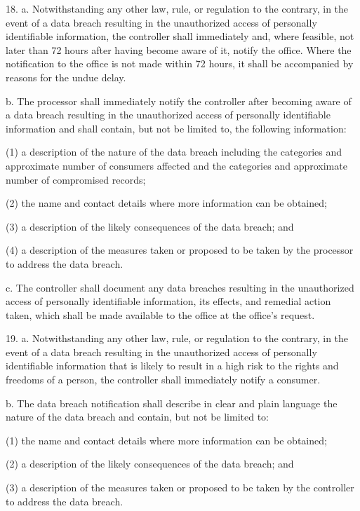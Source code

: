  

     18.  a.  Notwithstanding any other law, rule, or regulation to the contrary, in the event of a data breach resulting in the unauthorized access of personally identifiable information, the controller shall immediately and, where feasible, not later than 72 hours after having become aware of it, notify the office. Where the notification to the office is not made within 72 hours, it shall be accompanied by reasons for the undue delay.

     b.    The processor shall immediately notify the controller after becoming aware of a data breach resulting in the unauthorized access of personally identifiable information and shall contain, but not be limited to, the following information:

     (1)   a description of the nature of the data breach including the categories and approximate number of consumers affected and the categories and approximate number of compromised records;

     (2)   the name and contact details where more information can be obtained;

     (3)   a description of the likely consequences of the data breach; and

     (4)   a description of the measures taken or proposed to be taken by the processor to address the data breach.

     c.     The controller shall document any data breaches resulting in the unauthorized access of personally identifiable information, its effects, and remedial action taken, which shall be made available to the office at the office's request.

 

     19.  a.  Notwithstanding any other law, rule, or regulation to the contrary, in the event of a data breach resulting in the unauthorized access of personally identifiable information that is likely to result in a high risk to the rights and freedoms of a person, the controller shall immediately notify a consumer.

     b.    The data breach notification shall describe in clear and plain language the nature of the data breach and contain, but not be limited to:

     (1)   the name and contact details where more information can be obtained;

     (2)   a description of the likely consequences of the data breach; and

     (3)   a description of the measures taken or proposed to be taken by the controller to address the data breach.

